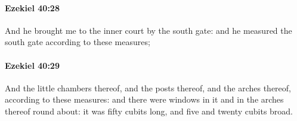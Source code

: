 		\paragraph{Ezekiel 40:28} %
			\label{EZEKIEL-40-28}

			And he brought me to the inner court by the south gate: and he measured the south gate according to these measures;


		\paragraph{Ezekiel 40:29} %
			\label{EZEKIEL-40-29}

			And the little chambers thereof, and the posts thereof, and the arches thereof, according to these measures: and there were windows in it and in the arches thereof round about: it was fifty cubits long, and five and twenty cubits broad.


